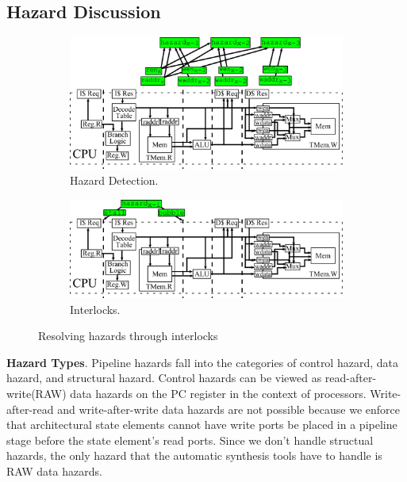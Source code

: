 \subsection{Hazard Discussion}
\begin{figure}[htb]
\centering
  \begin{subfigure}[t]{0.8\textwidth}
  \centering
  \includegraphics[width=\textwidth]{figures/pipelinehazard.pdf}
  \caption{Hazard Detection.}
  \label{fig:haz}
  \end{subfigure}
  \begin{subfigure}[t]{0.8\textwidth}
  \vspace{20pt}
  \centering
  \includegraphics[width=\textwidth]{figures/pipelineinterlock.pdf}
  \caption{Interlocks.}
  \label{fig:int}
  \end{subfigure}
\caption{Resolving hazards through interlocks}
\label{fig:hazint}
\end{figure}

{\bf Hazard Types}. Pipeline hazards fall into the categories of
control hazard, data hazard, and structural hazard. Control hazards
can be viewed as read-after-write(RAW) data hazards on the PC register
in the context of processors. Write-after-read and write-after-write
data hazards are not possible because we enforce that architectural
state elements cannot have write ports be placed in a pipeline stage
before the state element's read ports. Since we don't handle structual
hazards, the only hazard that the automatic synthesis tools have to
handle is RAW data hazards.

